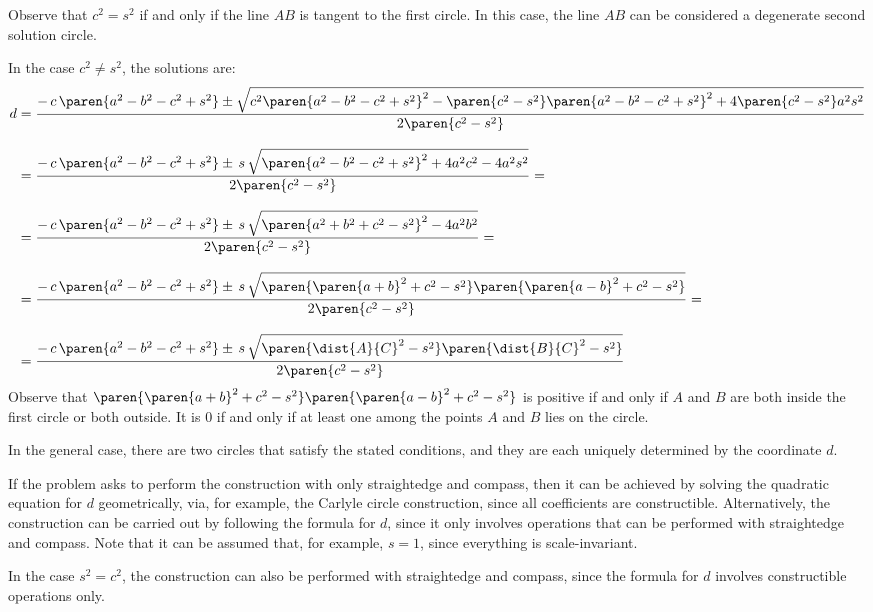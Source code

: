 Observe that $c^2 = s^2$ if and only if the line $AB$ is tangent to the first circle.
In this case, the line $AB$ can be considered a degenerate second solution circle.

\vspace{3ex}
In the case $c^2 \neq s^2$, the solutions are:
\begin{align*}
 d &= \frac{- \, c \, \paren{a^2 - b^2 - c^2 + s^2}
     \pm \sqrt{c^2 \paren{a^2 - b^2 - c^2 + s^2}^2
               - \paren{c^2 - s^2} \paren{a^2 - b^2 - c^2 + s^2}^2
               + 4 \paren{c^2 - s^2} a^2 s^2}}
     {2 \paren{c^2 - s^2}}
   \\[0.3cm]
   &= \frac{- \, c \, \paren{a^2 - b^2 - c^2 + s^2}
     \pm \, s \, \sqrt{\paren{a^2 - b^2 - c^2 + s^2}^2
                       + 4 a^2 c^2 - 4 a^2 s^2}}
     {2 \paren{c^2 - s^2}} =
   \\[0.3cm]
   &= \frac{- \, c \, \paren{a^2 - b^2 - c^2 + s^2}
     \pm \, s \, \sqrt{\paren{a^2 + b^2 + c^2 - s^2}^2
                       - 4 a^2 b^2}}
     {2 \paren{c^2 - s^2}} =
   \\[0.3cm]
   &= \frac{- \, c \, \paren{a^2 - b^2 - c^2 + s^2}
     \pm \, s \, \sqrt{\paren{\paren{a + b}^2 + c^2 - s^2}
                       \paren{\paren{a - b}^2 + c^2 - s^2}}}
     {2 \paren{c^2 - s^2}} =
   \\[0.3cm]
   &= \frac{- \, c \, \paren{a^2 - b^2 - c^2 + s^2}
     \pm \, s \, \sqrt{\paren{\dist{A}{C}^2 - s^2}
                       \paren{\dist{B}{C}^2 - s^2}}}
     {2 \paren{c^2 - s^2}}
\end{align*}
Observe that
$\paren{\paren{a + b}^2 + c^2 - s^2} \paren{\paren{a - b}^2 + c^2 - s^2}$
is positive if and only if $A$ and $B$ are both inside the first circle or both outside.
It is $0$ if and only if at least one among the points $A$ and $B$ lies on the circle.

In the general case, there are two circles that satisfy the stated conditions,
and they are each uniquely determined by the coordinate $d$.

If the problem asks to perform the construction with only straightedge and compass,
then it can be achieved by solving the quadratic equation for $d$ geometrically,
via, for example, the Carlyle circle construction,
since all coefficients are constructible.
Alternatively, the construction can be carried out by following the formula for $d$,
since it only involves operations that can be performed with straightedge and compass.
Note that it can be assumed that, for example, $s = 1$, since everything is scale-invariant.

In the case $s^2 = c^2$, the construction can also be performed with straightedge and compass,
since the formula for $d$ involves constructible operations only.
